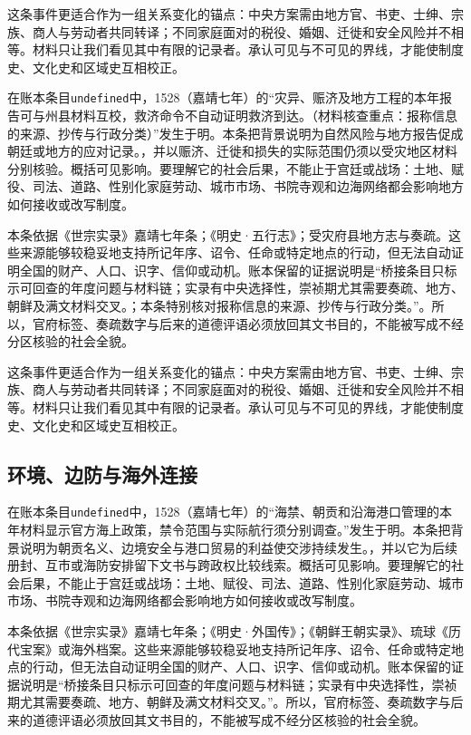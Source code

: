 这条事件更适合作为一组关系变化的锚点：中央方案需由地方官、书吏、士绅、宗族、商人与劳动者共同转译；不同家庭面对的税役、婚姻、迁徙和安全风险并不相等。材料只让我们看见其中有限的记录者。承认可见与不可见的界线，才能使制度史、文化史和区域史互相校正。

在账本条目\texttt{undefined}中，1528（嘉靖七年）的“灾异、赈济及地方工程的本年报告可与州县材料互校，救济命令不自动证明救济到达。（材料核查重点：报称信息的来源、抄传与行政分类）”发生于明。本条把背景说明为自然风险与地方报告促成朝廷或地方的应对记录。，并以赈济、迁徙和损失的实际范围仍须以受灾地区材料分别核验。概括可见影响。要理解它的社会后果，不能止于宫廷或战场：土地、赋役、司法、道路、性别化家庭劳动、城市市场、书院寺观和边海网络都会影响地方如何接收或改写制度。

本条依据《世宗实录》嘉靖七年条；《明史·五行志》；受灾府县地方志与奏疏。这些来源能够较稳妥地支持所记年序、诏令、任命或特定地点的行动，但无法自动证明全国的财产、人口、识字、信仰或动机。账本保留的证据说明是“桥接条目只标示可回查的年度问题与材料链；实录有中央选择性，崇祯期尤其需要奏疏、地方、朝鲜及满文材料交叉。；本条特别核对报称信息的来源、抄传与行政分类。”。所以，官府标签、奏疏数字与后来的道德评语必须放回其文书目的，不能被写成不经分区核验的社会全貌。

这条事件更适合作为一组关系变化的锚点：中央方案需由地方官、书吏、士绅、宗族、商人与劳动者共同转译；不同家庭面对的税役、婚姻、迁徙和安全风险并不相等。材料只让我们看见其中有限的记录者。承认可见与不可见的界线，才能使制度史、文化史和区域史互相校正。

\subsection{环境、边防与海外连接}

在账本条目\texttt{undefined}中，1528（嘉靖七年）的“海禁、朝贡和沿海港口管理的本年材料显示官方海上政策，禁令范围与实际航行须分别调查。”发生于明。本条把背景说明为朝贡名义、边境安全与港口贸易的利益使交涉持续发生。，并以它为后续册封、互市或海防安排留下文书与跨政权比较线索。概括可见影响。要理解它的社会后果，不能止于宫廷或战场：土地、赋役、司法、道路、性别化家庭劳动、城市市场、书院寺观和边海网络都会影响地方如何接收或改写制度。

本条依据《世宗实录》嘉靖七年条；《明史·外国传》；《朝鲜王朝实录》、琉球《历代宝案》或海外档案。这些来源能够较稳妥地支持所记年序、诏令、任命或特定地点的行动，但无法自动证明全国的财产、人口、识字、信仰或动机。账本保留的证据说明是“桥接条目只标示可回查的年度问题与材料链；实录有中央选择性，崇祯期尤其需要奏疏、地方、朝鲜及满文材料交叉。”。所以，官府标签、奏疏数字与后来的道德评语必须放回其文书目的，不能被写成不经分区核验的社会全貌。

